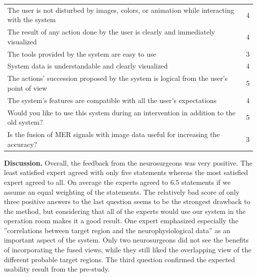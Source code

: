 \documentclass{vgtc}                          %
\begin{document}
\noindent \begin{tabular}{p{} c}
\hline
The user is not disturbed by images, colors, or animation while interacting with the system	& 4\\
The result of any action done by the user is clearly and immediately visualized				& 4\\
The tools provided by the system are easy to use												& 3\\
System data is understandable and clearly visualized											& 4\\
The actions' succession proposed by the system is logical from the user's point of view		& 5\\
The system's features are compatible with all the user's expectations							& 4\\
Would you like to use this system during an intervention in addition to the old system?		& 5\\
Is the fusion of MER signals with image data useful for increasing the accuracy?				& 3\\
\hline
\end{tabular}

\noindent \textbf{Discussion.} Overall, the feedback from the neurosurgeons was very positive. The least satisfied expert agreed with only five statements whereas the most satisfied expert agreed to all. On average the experts agreed to $6.5$ statements if we assume an equal weighting of the statements. The relatively bad score of only three positive answers to the last question seems to be the strongest drawback to the method, but considering that all of the experts would use our system in the operation room makes it a good result. One expert emphasized especially the ''correlations between target region and the neurophysiological data'' as an important aspect of the system. Only two neurosurgeons did not see the benefits of incorporating the fused views, while they still liked the overlapping view of the different probable target regions. The third question confirmed the expected usability result from the pre-study.
\end{document}
